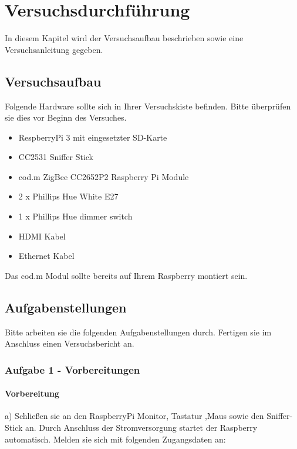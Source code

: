 \chapter{Versuchsdurchführung}

In diesem Kapitel wird der Versuchsaufbau beschrieben sowie eine Versuchsanleitung gegeben.

\section{Versuchsaufbau}

Folgende Hardware sollte sich in Ihrer Versuchskiste befinden. Bitte überprüfen sie dies vor Beginn des Versuches.

\begin{itemize}
    \item RespberryPi 3 mit eingesetzter SD-Karte
    \item CC2531 Sniffer Stick
    \item cod.m ZigBee CC2652P2 Raspberry Pi Module
    \item 2 x Phillips Hue White E27
    \item 1 x Phillips Hue dimmer switch
    \item HDMI Kabel
    \item Ethernet Kabel
\end{itemize}

Das cod.m Modul sollte bereits auf Ihrem Raspberry montiert sein. 

\section{Aufgabenstellungen}

Bitte arbeiten sie die folgenden Aufgabenstellungen durch. Fertigen sie im Anschluss einen Versuchsbericht an.

\subsection{Aufgabe 1 - Vorbereitungen}

\subsubsection{Vorbereitung}
a) Schließen sie an den RaspberryPi Monitor, Tastatur ,Maus sowie den Sniffer-Stick an. Durch Anschluss der
Stromversorgung startet der Raspberry automatisch. Melden sie sich mit folgenden Zugangsdaten an:

